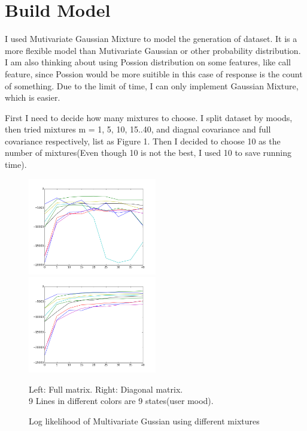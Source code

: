 \documentclass{article}
\begin{document}
\section{Build Model}
I used Mutivariate Gaussian Mixture to model the generation of dataset. It is a more flexible model than Mutivariate Gaussian or other probability distribution. I am also thinking about using Possion distribution on some features, like call feature, since Possion would be more suitible in this case of response is the count of something. Due to the limit of time, I can only implement Gaussian Mixture, which is easier.

First I need to decide how many mixtures to choose. I split dataset by moods, then tried mixtures m = 1, 5, 10, 15..40, and diagnal covariance and full covariance respectively, list as Figure 1. Then I decided to choose 10 as the number of mixtures(Even though 10 is not the best, I used 10 to save running time).

\graphicspath{ {/} }
\begin{figure}[ht]
\caption{Log likelihood of Multivariate Gussian using different mixtures}
\includegraphics[width=0.5\textwidth]{figure_1}
\includegraphics[width=0.5\textwidth]{figure_2}  
\begin{footnotesize}
Left: Full matrix. Right: Diagonal matrix.\\
9 Lines in different colors are 9 states(user mood). 
\end{footnotesize}
\end{figure}
\end{document}
